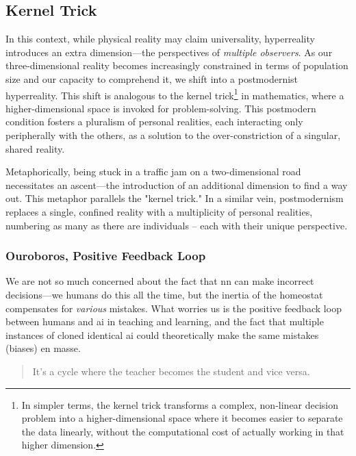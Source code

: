 \documentclass[11pt,a4]{article}
\begin{document}
    \subsection{Kernel Trick} \label{kerneltrick}

    In this context, while physical reality may
    claim universality, hyperreality\cite{BaudrillardSim}
    introduces an extra dimension---the perspectives of \textit{multiple observers}.
    As our three-dimensional reality becomes increasingly constrained
    in terms of population size and our capacity to comprehend it,
    we shift into a postmodernist hyperreality. This shift is analogous
    to the kernel trick\footnote{In simpler terms, the kernel trick
    transforms a complex, non-linear decision problem into a
    higher-dimensional space where it becomes easier to separate
    the data linearly, without the computational cost of actually
    working in that higher dimension.
    } in mathematics, where a higher-dimensional space is invoked
    for problem-solving.
    This postmodern condition fosters a pluralism of personal realities,
    each interacting only peripherally with the others, as a solution to
    the over-constriction of a singular, shared reality.

    Metaphorically, being stuck in a traffic jam on a two-dimensional
    road necessitates an ascent---the introduction of an additional
    dimension to find a way out. This metaphor parallels the "kernel trick."
    In a similar vein, postmodernism replaces a single, confined reality
    with a multiplicity of personal realities, numbering as many as
    there are individuals – each with their unique perspective.


    \subsubsection{Ouroboros, Positive Feedback Loop}

    We are not so much concerned about the fact
    that \acrshort{nn} can
    make incorrect decisions---we humans do this
    all the time, but the inertia of the homeostat
    compensates for \textit{various} mistakes. What worries us is the
    positive feedback loop between humans and \acrshort{ai}
    in teaching and learning, and the fact that multiple instances of
    cloned identical \acrshort{ai} could theoretically
    make the same
    mistakes (biases) en masse.

    \begin{quote}
        It's a cycle where the teacher becomes the student and vice versa.
    \end{quote}
\end{document}
